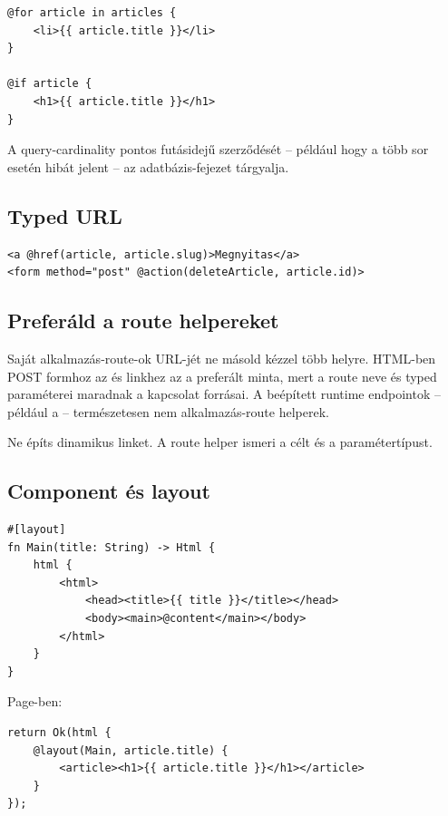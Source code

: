 \begin{lstlisting}[language=Velran]
@for article in articles {
    <li>{{ article.title }}</li>
}

@if article {
    <h1>{{ article.title }}</h1>
}
\end{lstlisting}

A query-cardinality pontos futásidejű szerződését -- például hogy a  több sor esetén hibát jelent -- az adatbázis-fejezet tárgyalja.

\subsection*{Typed URL}

\begin{lstlisting}[language=Velran]
<a @href(article, article.slug)>Megnyitas</a>
<form method="post" @action(deleteArticle, article.id)>
\end{lstlisting}

\subsection*{Preferáld a route helpereket}

Saját alkalmazás-route-ok URL-jét ne másold kézzel több helyre. HTML-ben POST formhoz az  és linkhez az  a preferált minta, mert a route neve és typed paraméterei maradnak a kapcsolat forrásai. A beépített runtime endpointok -- például a  -- természetesen nem alkalmazás-route helperek.


Ne építs dinamikus  linket. A route helper ismeri a célt és a paramétertípust.

\subsection*{Component és layout}

\begin{lstlisting}[language=Velran]
#[layout]
fn Main(title: String) -> Html {
    html {
        <html>
            <head><title>{{ title }}</title></head>
            <body><main>@content</main></body>
        </html>
    }
}
\end{lstlisting}

Page-ben:

\begin{lstlisting}[language=Velran]
return Ok(html {
    @layout(Main, article.title) {
        <article><h1>{{ article.title }}</h1></article>
    }
});
\end{lstlisting}

